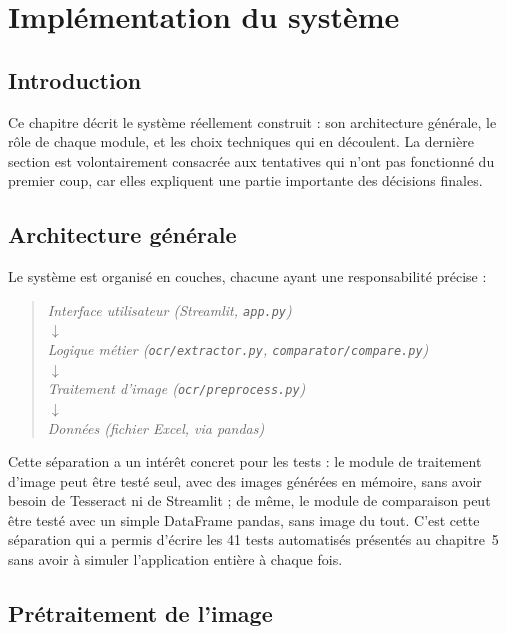 \chapter{Implémentation du système}
\minitoc
\newpage

\section{Introduction}

Ce chapitre décrit le système réellement construit : son architecture générale, le rôle de chaque module, et les choix techniques qui en découlent. La dernière section est volontairement consacrée aux tentatives qui n'ont pas fonctionné du premier coup, car elles expliquent une partie importante des décisions finales.

\section{Architecture générale}

Le système est organisé en couches, chacune ayant une responsabilité précise :

\begin{quote}
\textit{Interface utilisateur (Streamlit, \texttt{app.py})} \\
$\downarrow$ \\
\textit{Logique métier (\texttt{ocr/extractor.py}, \texttt{comparator/compare.py})} \\
$\downarrow$ \\
\textit{Traitement d'image (\texttt{ocr/preprocess.py})} \\
$\downarrow$ \\
\textit{Données (fichier Excel, via pandas)}
\end{quote}

Cette séparation a un intérêt concret pour les tests : le module de traitement d'image peut être testé seul, avec des images générées en mémoire, sans avoir besoin de Tesseract ni de Streamlit ; de même, le module de comparaison peut être testé avec un simple DataFrame pandas, sans image du tout. C'est cette séparation qui a permis d'écrire les 41 tests automatisés présentés au chapitre~5 sans avoir à simuler l'application entière à chaque fois.

\section{Prétraitement de l'image}

